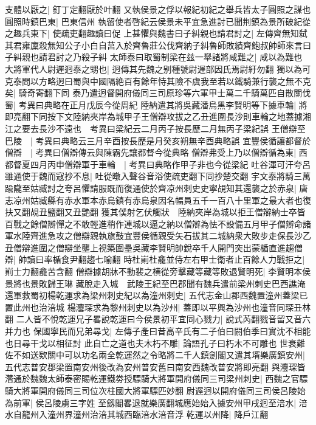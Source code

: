 支體以厭之|{
	釘丁定翻厭於叶翻}
又執侯景之俘以報紀初紀之舉兵皆太子圓照之謀也圓照時鎮巴東|{
	巴東信州}
執留使者啓紀云侯景未平宜急進討已聞荆鎮為景所破紀從之趣兵東下|{
	使疏吏翻趣讀曰促}
上甚懼與魏書曰子糾親也請君討之|{
	左傳齊無知弑其君雍廩殺無知公子小白自莒入於齊魯莊公伐齊納子糾魯師敗績齊鮑叔帥師來言曰子糾親也請君討之乃殺子糾}
太師泰曰取蜀制梁在兹一舉諸將咸難之|{
	咸以為難也}
大將軍代人尉遲迥泰之甥也|{
	迥傳其先魏之别種號尉遟部因氏焉尉紆勿翻}
獨以為可克泰問以方略迥曰蜀與中國隔絶百有餘年恃其險不虞我至若以鐵騎兼行襲之無不克矣|{
	騎奇寄翻下同}
泰乃遣迥督開府儀同三司原珍等六軍甲士萬二千騎萬匹自散關伐蜀|{
	考異曰典略在正月戊辰今從周紀}
陸納遣其將吳藏潘烏黑李賢明等下據車輪|{
	將即亮翻下同按下文陸納夾岸為城甲子王僧辯攻拔之乙丑進圍長沙則車輪之地蓋據湘江之要去長沙不遠也　考異曰梁紀云二月丙子按長歷二月無丙子梁紀誤}
王僧辯至巴陵　|{
	考異曰典略云三月辛酉按長歷是月癸亥朔無辛酉典略誤}
宜豐侯循讓都督於僧辯　|{
	考異曰僧辯傳云與陳霸先讓都督今從典略}
僧辯弗受上乃以僧辯循為東|{
	西}
都督夏四月丙申僧辯軍于車輪　|{
	考異曰典略作甲子非也今從梁紀}
吐谷渾可汗夸呂雖通使于魏而寇抄不息|{
	吐從暾入聲谷音浴使疏吏翻下同抄楚交翻}
宇文泰將騎三萬踰隴至姑臧討之夸呂懼請服既而復通使於齊凉州刺史史寧覘知其還襲之於赤泉|{
	唐志凉州姑臧縣有赤水軍本赤烏鎮有赤烏泉因名幅員五千一百八十里軍之最大者也復扶又翻覘丑鹽翻又丑艶翻}
獲其僕射乞伏觸狀　陸納夾岸為城以拒王僧辯納士卒皆百戰之餘僧辯憚之不敢輕進稍作連城以逼之納以僧辯為怯不設備五月甲子僧辯命諸軍水陸齊進急攻之僧辯親執旗鼓宜豐侯循親受矢石拔其二城納衆大敗步走保長沙乙丑僧辯進圍之僧辯坐壟上視築圍壘吳藏李賢明帥銳卒千人開門突出蒙楯直進趨僧辯|{
	帥讀曰率楯食尹翻趨七喻翻}
時杜崱杜龕並侍左右甲士衛者止百餘人力戰拒之|{
	崱士力翻龕苦含翻}
僧辯據胡牀不動裴之横從旁擊藏等藏等敗退賢明死|{
	李賢明本侯景將也景敗歸王琳}
藏脫走入城　武陵王紀至巴郡聞有魏兵遣前梁州刺史巴西譙淹還軍救蜀初楊乾運求為梁州刺史紀以為潼州刺史|{
	五代志金山郡西魏置潼州蓋梁已置此州也治涪城}
楊灋琛求為黎州刺史以為沙州|{
	蓋即以平興為沙州也潼音同琛丑林翻}
二人皆不悅乾運兄子畧說乾運曰今侯景初平宜同心戮力|{
	說式芮翻戮音留又音六并力也}
保國寧民而兄弟尋戈|{
	左傳子產曰昔高辛氏有二子伯曰閼伯季曰實沈不相能也日尋干戈以相征討}
此自亡之道也夫木朽不雕|{
	論語孔子曰朽木不可雕也}
世衰難佐不如送欵關中可以功名兩全乾運然之令略將二千人鎮劍閣又遣其壻樂廣鎮安州|{
	五代志普安郡梁置南安州後改為安州普安舊曰南安西魏改普安將即亮翻}
與灋琛皆濳通於魏魏太師泰密賜乾運鐵劵授驃騎大將軍開府儀同三司梁州刺史|{
	西魏之官驃騎大將軍開府儀同三司位次柱國大將軍驃匹妙翻}
尉遟迥以開府儀同三司侯呂陵始為前軍|{
	侯呂陵虜三字姓}
至劔閣畧退就樂廣翻城應始始入據安州甲戌迥至涪水|{
	涪水自龍州入潼州界潼州治涪其城西臨涪水涪音浮}
乾運以州降|{
	降戶江翻}
